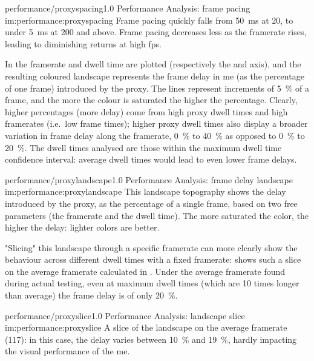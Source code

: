 \begin{image}
	{performance/proxyspacing}{1.0}
	{Performance Analysis: frame pacing}
	{im:performance:proxyspacing}
	{}
	{Frame pacing quickly falls from \SI{50}{\milli\second} at \SI{20}{\fps}, to under \SI{5}{\milli\second} at \SI{200}{\fps} and above. Frame pacing decreases less as the \gls{framerate} rises, leading to diminishing returns at high \gls{fps}.}
\end{image}

In  the \gls{framerate} and dwell time are plotted (respectively the  and  axis), and the resulting coloured landscape represents the frame delay in \gls{me} (as the percentage of one frame) introduced by the \gls{proxy}. The lines represent increments of \SI{5}{\percent} of a frame, and the more the colour is saturated the higher the percentage. Clearly, higher percentages (more delay) come from high \gls{proxy} dwell times and high \glspl{framerate} (i.e.\ low frame times); higher \gls{proxy} dwell times also display a broader variation in frame delay along the \gls{framerate}, \SI{0}{\percent} to \SI{40}{\percent} as opposed to \SI{0}{\percent} to \SI{20}{\percent}. The dwell times analysed are those within the maximum dwell time confidence interval: average dwell times would lead to even lower frame delays.

\begin{image}
	{performance/proxylandscape}{1.0}
	{Performance Analysis: frame delay landscape}
	{im:performance:proxylandscape}
	{}
	{This landscape topography shows the delay introduced by the \gls{proxy}, as the percentage of a single frame, based on two free parameters (the \gls{framerate} and the dwell time). The more saturated the color, the higher the delay: lighter colors are better.}
\end{image}

"Slicing" this landscape through a specific \gls{framerate} can more clearly show the behaviour across different dwell times with a fixed \gls{framerate}:  shows such a slice on the average \gls{framerate} calculated in . Under the average \gls{framerate} found during actual testing, even at maximum dwell times (which are \num{10} times longer than average) the frame delay is of only \SI{20}{\percent}.

\begin{image}
	{performance/proxyslice}{1.0}
	{Performance Analysis: landscape slice}
	{im:performance:proxyslice}
	{}
	{A slice of the landscape on the average \gls{framerate} (\SI{117}{\fps}): in this case, the delay varies between \SI{10}{\percent} and \SI{19}{\percent}, hardly impacting the visual performance of the \gls{me}.}
\end{image}

